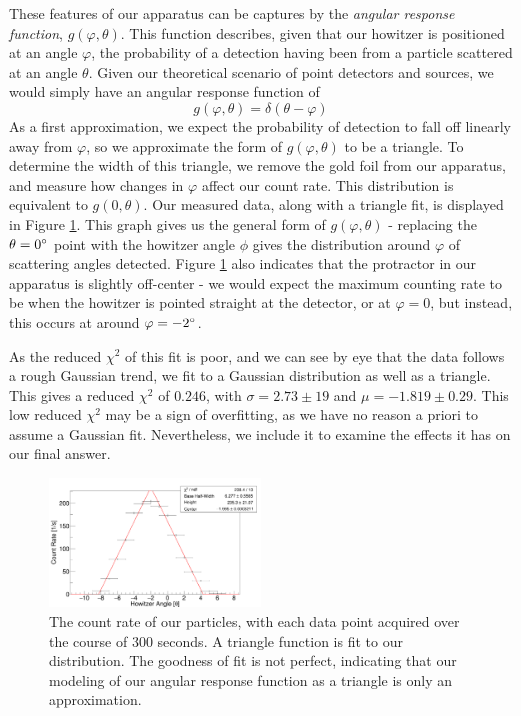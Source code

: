 These features of our apparatus can be captures by the \textit{angular response function}, $g(\varphi, \theta)$. This function describes, given that our howitzer is positioned at an angle $\varphi$, the probability of a detection having been from a particle scattered at an angle $\theta$. Given our theoretical scenario of point detectors and sources, we would simply have an angular response function of
\begin{equation}
  g(\varphi, \theta) = \delta(\theta - \varphi)
\end{equation}
As a first approximation, we expect the probability of detection to fall off linearly away from $\varphi$, so we approximate the form of $g(\varphi, \theta)$ to be a triangle. To determine the width of this triangle, we remove the gold foil from our apparatus, and measure how changes in $\varphi$ affect our count rate. This distribution is equivalent to $g(0, \theta)$. Our measured data, along with a triangle fit, is displayed in Figure \ref{profile}. This graph gives us the general form of $g(\varphi, \theta)$ - replacing the $\theta=0\degree$ point with the howitzer angle $\phi$ gives the distribution around $\varphi$ of scattering angles detected. Figure \ref{profile} also indicates that the protractor in our apparatus is slightly off-center - we would expect the maximum counting rate to be when the howitzer is pointed straight at the detector, or at $\varphi = 0$\degree, but instead, this occurs at around $\varphi = -2\degree$.

As the reduced $\chi^2$ of this fit is poor, and we can see by eye that the data follows a rough Gaussian trend, we fit to a Gaussian distribution as well as a triangle. This gives a reduced $\chi^2$ of $0.246$, with  $\sigma = 2.73 \pm 19$ and $\mu = -1.819 \pm 0.29$. This low reduced $\chi^2$ may be a sign of overfitting, as we have no reason a priori to assume a Gaussian fit. Nevertheless, we include it to examine the effects it has on our final answer.
\begin{figure}[h]
  \includegraphics[width=0.5\textwidth]{c1.png}
  \caption{The count rate of our particles, with each data point acquired over the course of 300 seconds. A triangle function is fit to our distribution. The goodness of fit is not perfect, indicating that our modeling of our angular response function as a triangle is only an approximation.}
  \label{profile}
\end{figure}

